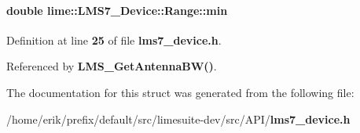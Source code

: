 \paragraph[{min}]{\setlength{\rightskip}{0pt plus 5cm}double lime\+::\+L\+M\+S7\+\_\+\+Device\+::\+Range\+::min}\label{structlime_1_1LMS7__Device_1_1Range_aec8f4af1e85992b8a7cf0a08e60cc2dd}


Definition at line {\bf 25} of file {\bf lms7\+\_\+device.\+h}.



Referenced by {\bf L\+M\+S\+\_\+\+Get\+Antenna\+B\+W()}.



The documentation for this struct was generated from the following file\+:\begin{DoxyCompactItemize}
\item 
/home/erik/prefix/default/src/limesuite-\/dev/src/\+A\+P\+I/{\bf lms7\+\_\+device.\+h}\end{DoxyCompactItemize}
